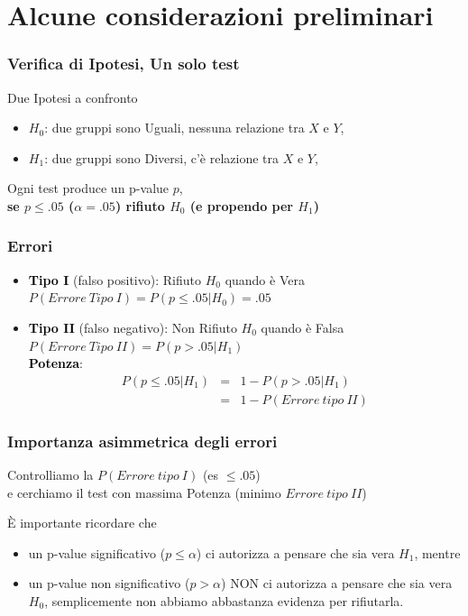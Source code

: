 \documentclass[xcolor={pdftex,dvipsnames,table}]{beamer}
\newcommand{\bbf}[1]{\textcolor{black}{\bf #1}}
\newcommand{\bb}[1]{\begin{block}{#1}}
\newcommand{\eb}{\end{block}}
\newcommand{\bi}{\begin {itemize}}
\newcommand{\ei}{\end{itemize}}
\newcommand{\bfr}[1]{\begin{frame} \frametitle{#1}}
\begin{document}
\section{Alcune considerazioni preliminari}
\bfr{Verifica di Ipotesi, Un solo test}%
\bb{Due Ipotesi a confronto}
\bi
\item $H_0$: due gruppi sono Uguali, nessuna relazione tra $X$ e $Y$, 
\item $H_1$: due gruppi sono Diversi, c'\`e relazione tra $X$ e $Y$,
\ei
Ogni test produce un p-value $p$, \\ {\bf se $p\leq .05$ ($\alpha=.05$) rifiuto $H_0$ (e propendo per $H_1$)}
\eb
\end{frame}

\bfr{Errori}%
\bi
\item \bbf{Tipo I} (falso positivo): Rifiuto $H_0$ quando \`e Vera \\
$P(Errore\ Tipo\ I)=P(p\leq .05 | H_0)=.05$
\item \bbf{Tipo II} (falso negativo): Non Rifiuto $H_0$ quando \`e Falsa \\
$P(Errore\ Tipo\ II)=P(p> .05 | H_1)$\\
\bbf{Potenza}: \begin{eqnarray}\nonumber P(p\leq .05 | H_1)&=& 1-P(p>.05 | H_1)\\ \nonumber &=& 1-P(Errore\ tipo\ II) \end{eqnarray}
\ei

\end{frame}

\bfr{Importanza asimmetrica degli errori}

 Controlliamo la $P(Errore\ tipo\ I)$ (es $\leq .05$)\\
e cerchiamo il test con massima Potenza (minimo $Errore\ tipo\ II$)
\bigskip

\`E importante ricordare che
\bi
  \item[-] un p-value significativo ($p\leq\alpha$) ci autorizza a pensare che sia vera $H_1$, mentre
  \item[-] un p-value non significativo ($p>\alpha$) NON ci autorizza a pensare che sia vera $H_0$, semplicemente non abbiamo abbastanza evidenza per rifiutarla.
\ei
\end{frame}
\end{document}
